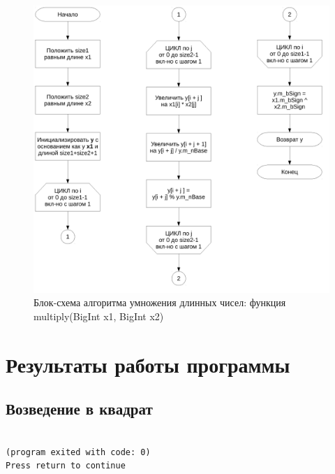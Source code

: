 \documentclass[a4paper,12pt]{article} %
\begin{document}
\begin{figure}[ht]
	\includegraphics[width=\textwidth]{lr2_multiply.pdf}
	\caption{Блок-схема алгоритма умножения длинных чисел: функция multiply(BigInt x1, BigInt x2)}
\end{figure}


\clearpage

\section*{Результаты работы программы}



\subsection*{Возведение в квадрат}
\begin{verbatim}

(program exited with code: 0)
Press return to continue
\end{verbatim}


\printbibliography
\end{document}
